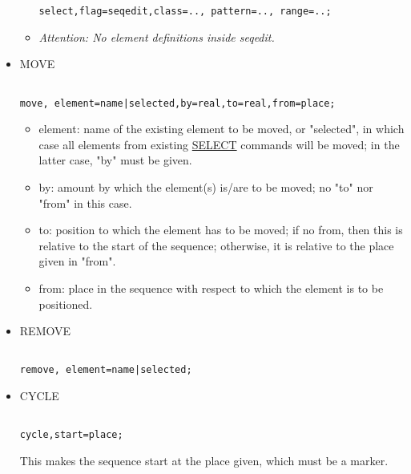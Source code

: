 \begin{itemize}
\begin{itemize}
\begin{verbatim}
select,flag=seqedit,class=.., pattern=.., range=..;
\end{verbatim}
	\item \textit{ Attention: No element definitions inside seqedit. }


\end{itemize}
	\item MOVE
\begin{verbatim}

move, element=name|selected,by=real,to=real,from=place;
\end{verbatim}
\begin{itemize}
	\item element: name of the existing element to be moved, or "selected", in which case all elements from existing  \href{../Introduction/select.html}{SELECT} commands will be moved; in the latter case, "by" must be given. 
	\item by: amount by which the element(s) is/are to be moved; no "to" nor "from" in this case. 
	\item to: position to which the element has to be moved; if no from, then this is relative to the start of the sequence; otherwise, it is relative to the place given in "from". 
	\item from: place in the sequence with respect to which the element is to be positioned. 
\end{itemize}


	\item REMOVE
\begin{verbatim}

remove, element=name|selected;
\end{verbatim}
	\item CYCLE
\begin{verbatim}

cycle,start=place;
\end{verbatim} This makes the sequence start at the place given, which must be a marker. 


\end{itemize}
